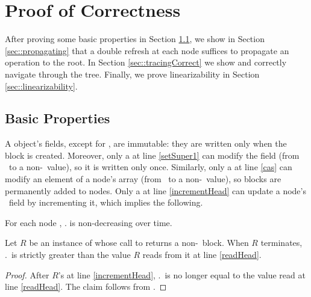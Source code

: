 
\section{Proof of Correctness}
\label{sec::correctness}

After proving some basic properties in Section \ref{sec::basicProperties},
we show in Section \ref{sec::propagating} that a double refresh at each node
suffices to propagate an operation to the root.
In Section \ref{sec::tracingCorrect} we show  and 
correctly navigate through the  tree.
Finally, we prove linearizability in Section \ref{sec::linearizability}.

\subsection{Basic Properties}
\label{sec::basicProperties}

A  object's fields, except for , are immutable:  they are written only 
when the block is created.
Moreover, only a  at line \ref{setSuper1} can modify the  field 
(from \nl\ to a non-\nl\ value), so it is written only once.
Similarly, only a  at line \ref{cas} can modify an element of a node's  array 
(from \nl\ to a non-\nl\ value), so blocks are permanently added to nodes.
Only a  at line \ref{incrementHead} can update a node's \head\ field by incrementing it,
which implies the following.

\begin{observation} \label{nonDecreasingHead}
For each node ,  . is non-decreasing over time.
\end{observation}

\begin{lemma} \label{lem::headInc}
Let $R$ be an instance of  whose call to  returns a non-\nl\ block.  When $R$ terminates, .\head\ is strictly greater than the value $R$ reads from it at line \ref{readHead}.
\end{lemma}
\begin{proof}
After $R$'s  at line \ref{incrementHead}, .\head\ is no longer equal to the value 
read at line \ref{readHead}.  The claim follows from .
\end{proof}

